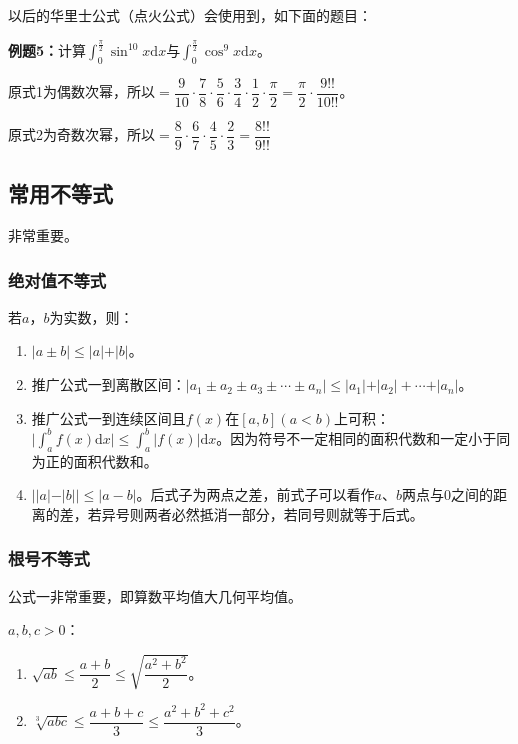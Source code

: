 \documentclass[UTF8, 12pt]{ctexart}
\begin{document}
以后的华里士公式（点火公式）会使用到，如下面的题目：

\textbf{例题5：}计算$\int_0^{\frac{\pi}{2}}\sin^{10}x\textrm{d}x$与$\int_0^{\frac{\pi}{2}}\cos^9x\textrm{d}x$。\medskip

原式1为偶数次幂，所以$=\dfrac{9}{10}\cdot\dfrac{7}{8}\cdot\dfrac{5}{6}\cdot\dfrac{3}{4}\cdot\dfrac{1}{2}\cdot\dfrac{\pi}{2}=\dfrac{\pi}{2}\cdot\dfrac{9!!}{10!!}$。\medskip

原式2为奇数次幂，所以$=\dfrac{8}{9}\cdot\dfrac{6}{7}\cdot\dfrac{4}{5}\cdot\dfrac{2}{3}=\dfrac{8!!}{9!!}$

\subsection{常用不等式}

非常重要。

\subsubsection{绝对值不等式}

若$a$，$b$为实数，则：

\begin{enumerate}
    \item $\vert a\pm b\vert\leqslant\vert a\vert+\vert b\vert$。
    \item 推广公式一到离散区间：$\vert a_1\pm a_2\pm a_3\pm\cdots\pm a_n\vert\leqslant\vert a_1\vert+\vert a_2\vert+\cdots+\vert a_n\vert$。
    \item 推广公式一到连续区间且$f(x)$在$[a,b](a<b)$上可积：$\vert\int_a^bf(x)\textrm{d}x\vert\leqslant\int_a^b\vert f(x)\vert\textrm{d}x$。因为符号不一定相同的面积代数和一定小于同为正的面积代数和。
    \item $\vert\vert a\vert-\vert b\vert\vert\leqslant\vert a-b\vert$。后式子为两点之差，前式子可以看作$a$、$b$两点与0之间的距离的差，若异号则两者必然抵消一部分，若同号则就等于后式。
\end{enumerate}



\subsubsection{根号不等式}

公式一非常重要，即算数平均值大几何平均值。

$a,b,c>0$：

\begin{enumerate}
    \item $\sqrt{ab}\leqslant\dfrac{a+b}{2}\leqslant\sqrt{\dfrac{a^2+b^2}{2}}$。
    \item $\sqrt[3]{abc}\leqslant\dfrac{a+b+c}{3}\leqslant\dfrac{a^2+b^2+c^2}{3}$。
\end{enumerate}
\end{document}
